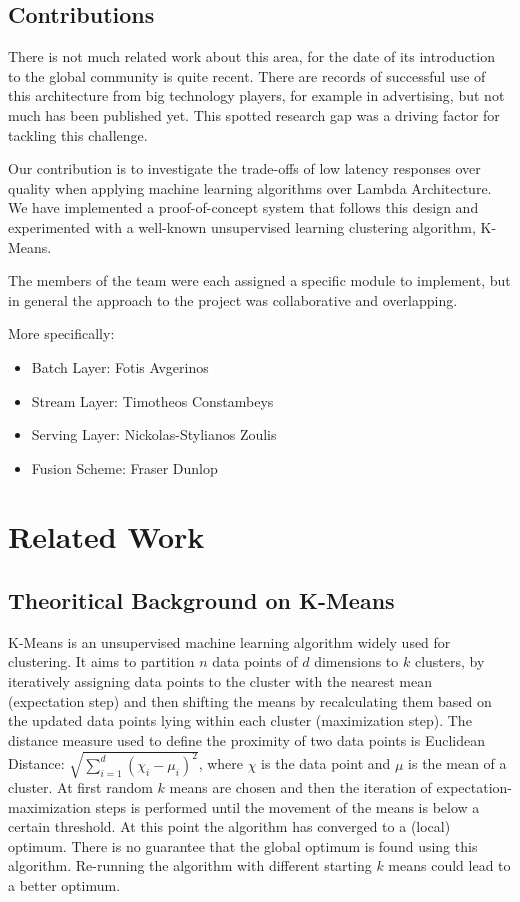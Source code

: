 \documentclass{lmproj}
\begin{document}
\section{Contributions}
\label{intro}

There is not much related work about this area, for the date of its introduction to the global community is quite recent. There are records of successful use of this architecture from big technology players, for example in advertising, but not much has been published yet. This spotted research gap was a driving factor for tackling this challenge.

Our contribution is to investigate the trade-offs of low latency responses over quality when applying machine learning algorithms over Lambda Architecture. We have implemented a proof-of-concept system that follows this design and experimented with a well-known unsupervised learning clustering algorithm, K-Means. 

The members of the team were each assigned a specific module to implement, but in general the approach to the project was collaborative and overlapping. 

More specifically:
\begin{itemize}
	\item Batch Layer: Fotis Avgerinos
	\item Stream Layer: Timotheos Constambeys
	\item Serving Layer: Nickolas-Stylianos Zoulis
	\item Fusion Scheme: Fraser Dunlop
\end{itemize}


\chapter{Related Work}
\label{relatedwork}

\section{Theoritical Background on K-Means}
\label{relatedwork}

K-Means is an unsupervised machine learning algorithm widely used for clustering. It aims to partition $n$ data points of $d$ dimensions to $k$ clusters, by iteratively assigning data points to the cluster with the nearest mean (expectation step) and then shifting the means by recalculating them based on the updated data points lying within each cluster (maximization step). The distance measure used to define the proximity of two data points is Euclidean Distance: $\sqrt{\sum_{i=1}^{d} ({\chi_i - \mu_i})^2}$, where $\chi$ is the data point and  $\mu$ is the mean of a cluster. At first random $k$ means are chosen and then the iteration of expectation-maximization steps is performed until the movement of the means is below a certain threshold. At this point the algorithm has converged to a (local) optimum. There is no guarantee that the global optimum is found using this algorithm. Re-running the algorithm with different starting $k$ means could lead to a better optimum.
\end{document}
